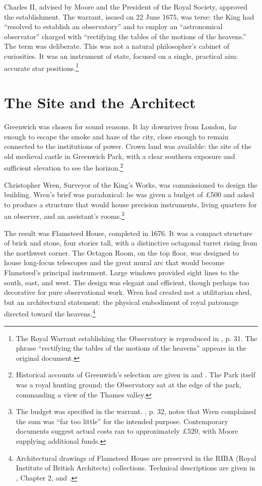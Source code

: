 Charles II, advised by Moore and the President of the Royal Society, approved the establishment. The warrant, issued on 22 June 1675, was terse: the King had ``resolved to establish an observatory'' and to employ an ``astronomical observator'' charged with ``rectifying the tables of the motions of the heavens.'' The term was deliberate. This was not a natural philosopher's cabinet of curiosities. It was an instrument of state, focused on a single, practical aim: accurate star positions.\footnote{The Royal Warrant establishing the Observatory is reproduced in \textcite{Baily1835}, p. 31. The phrase ``rectifying the tables of the motions of the heavens'' appears in the original document.}

\section{The Site and the Architect}
\label{sec:site-architect}

Greenwich was chosen for sound reasons. It lay downriver from London, far enough to escape the smoke and haze of the city, close enough to remain connected to the institutions of power. Crown land was available: the site of the old medieval castle in Greenwich Park, with a clear southern exposure and sufficient elevation to see the horizon.\footnote{Historical accounts of Greenwich's selection are given in \textcite{Howse1980} and \textcite{Willmoth1992}. The Park itself was a royal hunting ground; the Observatory sat at the edge of the park, commanding a view of the Thames valley.}

Christopher Wren, Surveyor of the King's Works, was commissioned to design the building. Wren's brief was paradoxical: he was given a budget of \pounds500 and asked to produce a structure that would house precision instruments, living quarters for an observer, and an assistant's rooms.\footnote{The budget was specified in the warrant. \textcite{Baily1835}, p. 32, notes that Wren complained the sum was ``far too little'' for the intended purpose. Contemporary documents suggest actual costs ran to approximately \pounds520, with Moore supplying additional funds.} 

The result was Flamsteed House, completed in 1676. It was a compact structure of brick and stone, four stories tall, with a distinctive octagonal turret rising from the northwest corner. The Octagon Room, on the top floor, was designed to house long-focus telescopes and the great mural arc that would become Flamsteed's principal instrument. Large windows provided sight lines to the south, east, and west. The design was elegant and efficient, though perhaps too decorative for pure observational work. Wren had created not a utilitarian shed, but an architectural statement: the physical embodiment of royal patronage directed toward the heavens.\footnote{Architectural drawings of Flamsteed House are preserved in the RIBA (Royal Institute of British Architects) collections. Technical descriptions are given in \textcite{Howse1980}, Chapter 2, and \textcite{WilmothFlamsteeds2002}.}

